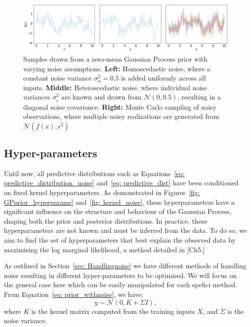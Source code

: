 \documentclass[12pt]{article}
\begin{document}
\begin{figure}[H]
    \centering
    \includegraphics[width=\textwidth]{LatexPlots/1dplots/GPR_noise_comparison.png}
    \caption{Samples drawn from a zero-mean Gaussian Process prior with varying noise assumptions.
    \textbf{Left:} Homoscedastic noise, where a constant noise variance \(\sigma_n^2 = 0.5\) is added uniformly across all inputs.
    \textbf{Middle:} Heteroscedastic noise, where individual noise variances \(\sigma_i^2\) are known and drawn from \(\mathcal{N}(0, 0.5)\), resulting in a diagonal noise covariance.
    \textbf{Right:} Monte Carlo sampling of noisy observations, where multiple noisy realizations are generated from \(\mathcal{N}(f(x), \epsilon^2)\)}
    \label{fig:noise_comparison}
\end{figure}




\subsection{Hyper-parameters}
\label{sec: Hyper_parameters}
Until now, all predictive distributions such as Equations~\ref{eq: predictive_distribution_noise} and~\ref{eq: predictive_dist} have been conditioned on fixed kernel hyperparameters. As demonstrated in Figures~\ref{fig: GPprior_hyperparams} and~\ref{fig: kernel_noise}, these hyperparameters have a significant influence on the structure and behaviour of the Gaussian Process, shaping both the prior and posterior distributions. 
In practice, these hyperparameters are not known and must be inferred from the data. To do so, we aim to find the set of hyperparameters that best explain the observed data by maximising the log marginal likelihood, a method detailed in [Ch5\cite{bible}.]

\noindent
As outlined in Section~\ref{sec: Handlingnoise} we have different methods of handling noise resulting in different hyper-parameters to be optimised. We will focus on the general case here which can be easily manipulated for each spefici method.
From Equation~\ref{eq: prior_withnoise}, we have:
\[
y \sim \mathcal{N}(0, K + \Sigma I),
\]
where \( K \) is the kernel matrix computed from the training inputs \( X \), and \( \Sigma\) is the noise variance.
\end{document}
